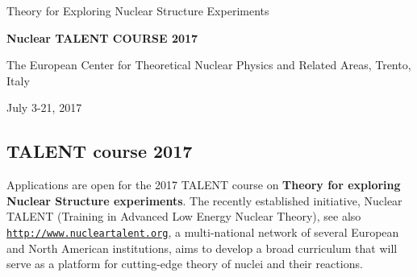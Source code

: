 \documentclass[%
oneside,                 %
final,                   %
10pt]{article}
\begin{document}

\newcommand{\exercisesection}[1]{\subsection*{#1}}






\thispagestyle{empty}

\begin{center}
{\LARGE\bf
\begin{spacing}{1.25}
Theory for Exploring Nuclear Structure Experiments
\end{spacing}
}
\end{center}


\begin{center}
{\bf Nuclear TALENT COURSE 2017}
\end{center}

    \begin{center}
\centerline{{\small The European Center for Theoretical Nuclear Physics and Related Areas, Trento, Italy}}
\end{center}
    

\begin{center}
July 3-21, 2017
\end{center}

\vspace{1cm}


\subsection{TALENT course 2017}

Applications are open for the 2017 TALENT course on 
\textbf{Theory for exploring Nuclear Structure experiments}.  The recently established
initiative, Nuclear TALENT (Training in Advanced Low Energy Nuclear Theory), 
see also \href{{http://www.nucleartalent.org}}{\nolinkurl{http://www.nucleartalent.org}}, a multi-national network of
several European and North American institutions, aims to develop a
broad curriculum that will serve as a platform for cutting-edge theory
of nuclei and their reactions.
\end{document}

